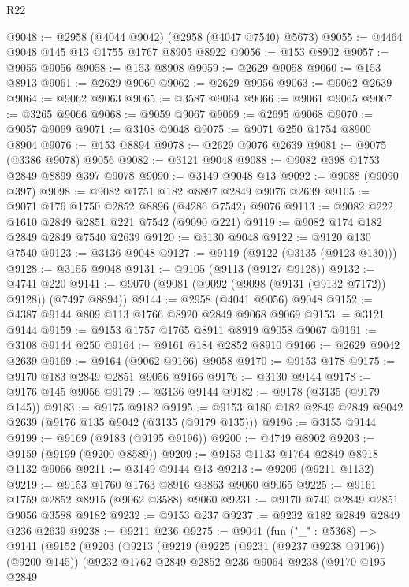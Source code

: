 \begin{lexlean}{R22}
\begin{coremodule}
@9048 := @2958 (@4044 @9042) (@2958 (@4047 @7540) @5673)
@9055 := @4464 @9048 @145 @13 @1755 @1767 @8905 @8922
@9056 := @153 @8902
@9057 := @9055 @9056
@9058 := @153 @8908
@9059 := @2629 @9058
@9060 := @153 @8913
@9061 := @2629 @9060
@9062 := @2629 @9056
@9063 := @9062 @2639
@9064 := @9062 @9063
@9065 := @3587 @9064
@9066 := @9061 @9065
@9067 := @3265 @9066
@9068 := @9059 @9067
@9069 := @2695 @9068
@9070 := @9057 @9069
@9071 := @3108 @9048
@9075 := @9071 @250 @1754 @8900 @8904
@9076 := @153 @8894
@9078 := @2629 @9076 @2639
@9081 := @9075 (@3386 @9078) @9056
@9082 := @3121 @9048
@9088 := @9082 @398 @1753 @2849 @8899 @397 @9078
@9090 := @3149 @9048 @13
@9092 := @9088 (@9090 @397)
@9098 := @9082 @1751 @182 @8897 @2849 @9076 @2639
@9105 := @9071 @176 @1750 @2852 @8896 (@4286 @7542) @9076
@9113 := @9082 @222 @1610 @2849 @2851 @221 @7542 (@9090 @221)
@9119 := @9082 @174 @182 @2849 @2849 @7540 @2639
@9120 := @3130 @9048
@9122 := @9120 @130 @7540
@9123 := @3136 @9048
@9127 := @9119 (@9122 (@3135 (@9123 @130)))
@9128 := @3155 @9048
@9131 := @9105 (@9113 (@9127 @9128))
@9132 := @4741 @220
@9141 := @9070 (@9081 (@9092 (@9098 (@9131 (@9132 @7172)) @9128)) (@7497 @8894))
@9144 := @2958 (@4041 @9056) @9048
@9152 := @4387 @9144 @809 @113 @1766 @8920 @2849 @9068 @9069
@9153 := @3121 @9144
@9159 := @9153 @1757 @1765 @8911 @8919 @9058 @9067
@9161 := @3108 @9144 @250
@9164 := @9161 @184 @2852 @8910
@9166 := @2629 @9042 @2639
@9169 := @9164 (@9062 @9166) @9058
@9170 := @9153 @178
@9175 := @9170 @183 @2849 @2851 @9056 @9166
@9176 := @3130 @9144
@9178 := @9176 @145 @9056
@9179 := @3136 @9144
@9182 := @9178 (@3135 (@9179 @145))
@9183 := @9175 @9182
@9195 := @9153 @180 @182 @2849 @2849 @9042 @2639 (@9176 @135 @9042 (@3135 (@9179 @135)))
@9196 := @3155 @9144
@9199 := @9169 (@9183 (@9195 @9196))
@9200 := @4749 @8902
@9203 := @9159 (@9199 (@9200 @8589))
@9209 := @9153 @1133 @1764 @2849 @8918 @1132 @9066
@9211 := @3149 @9144 @13
@9213 := @9209 (@9211 @1132)
@9219 := @9153 @1760 @1763 @8916 @3863 @9060 @9065
@9225 := @9161 @1759 @2852 @8915 (@9062 @3588) @9060
@9231 := @9170 @740 @2849 @2851 @9056 @3588 @9182
@9232 := @9153 @237
@9237 := @9232 @182 @2849 @2849 @236 @2639
@9238 := @9211 @236
@9275 := @9041
    (fun ("_" : @5368) =>
    @9141
      (@9152
        (@9203
          (@9213
            (@9219
              (@9225 (@9231 (@9237 @9238 @9196)) (@9200 @145))
              (@9232
                @1762
                @2849
                @2852
                @236
                @9064
                @9238
                (@9170
                  @195
                  @2849

\end{coremodule}
\end{lexlean}
